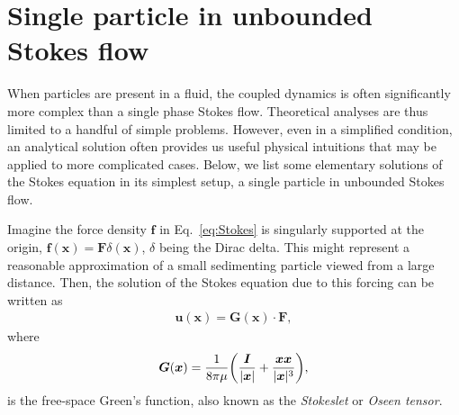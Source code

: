 \section{Single particle in unbounded Stokes flow}
\label{sec:single-p}

When particles are present in a fluid, the coupled dynamics is often significantly more complex than a single phase Stokes flow.
Theoretical analyses are thus limited to a handful of simple problems.
However, even in a simplified condition, an analytical solution often provides us useful physical intuitions that may be applied to more complicated cases.
Below, we list some elementary solutions of the Stokes equation in its simplest setup, \ie a single particle in unbounded Stokes flow.

\medskip
Imagine the force density ${\bm f}$ in Eq.\ \eqref{eq:Stokes} is singularly supported at the origin, \ie ${\bm f}({\bm x})={\bm F}\delta({\bm x})$, $\delta$ being the Dirac delta.
This might represent a reasonable approximation of a small sedimenting particle viewed from a large distance.
Then, the solution of the Stokes equation due to this forcing can be written as
\begin{equation} \label{eq:stokes-green}
 \begin{aligned}
   {\bm u}({\bm x}) = {\bm G}({\bm x}) \cdot {\bm F},
 \end{aligned}
\end{equation}
where  
\begin{equation} \label{eq:stokeslet}
 \begin{aligned}
   {\bm G}({\bm x}) = \frac{1}{8\pi\mu } \bigg( \frac{{\bm I}}{\lvert\bm x\rvert}+\frac{ {\bm x}{\bm x} }{ \lvert{\bm x}\rvert^3 } \bigg),
 \end{aligned}
\end{equation}
is the free-space Green's function, also known as the \emph{Stokeslet} or \emph{Oseen tensor}.

